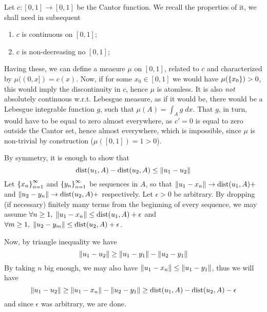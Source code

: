\documentclass[10pt]{article} %
\begin{document}
\begin{enumerate}[\bf{[}1{]}]
		Let $c:[0,1]\to[0,1]$ be the Cantor function. We recall the properties of it, we shall need in subsequent
		\begin{enumerate}[1)]
			\item $c$ is continuous on $[0,1]$;
			\item $c$ is non-decreasing no $[0,1]$;
		\end{enumerate}
		Having these, we can define a measure $\mu$ on $[0,1]$, related to $c$ and characterized by $\mu((0,x])=c(x)$.
		Now, if for some $x_0\in[0,1]$ we would have $\mu(\left\{x_0\right\})>0$, this would imply the discontinuity in $c$, hence
		$\mu$ is atomless. It is also \textit{not} absolutely continuous w.r.t. Lebesgue measure, as if it would be,
		there would be a Lebesgue integrable function $g$, such that $\mu(A)=\int_Ag\;dx$. That $g$, in turn, would have
		to be equal to zero almost everywhere, as $c'=0$ is equal to zero outside the Cantor set, hence almost everywhere,
		which is impossible, since $\mu$ is non-trivial by construction ($\mu([0,1])=1>0$).
		\setcounter{enumi}{5}
	\item By symmetry, it is enough to show that
		\[\mbox{dist}(u_1,A)-\mbox{dist}(u_2,A)\leq \|u_1-u_2\|\]
		Let $\left\{x_n\right\}_{n=1}^\infty$ and
		$\left\{y_n\right\}_{n=1}^\infty$
		be sequences in $A$, so that $\|u_1-x_n\|\to\mbox{dist}(u_1,A)+$ and $\|u_2-y_n\|\to\mbox{dist}(u_2,A)+$ 
		respectively. Let $\epsilon>0$ be arbitrary. By dropping (if necessary) finitely many terms from the beginning
		of every sequence, we may assume $\forall n\geq1,\;\|u_1-x_n\|\leq\mbox{dist}(u_1,A)+\epsilon$ and
		$\forall m\geq1,\;\|u_2-y_m\|\leq\mbox{dist}(u_2,A)+\epsilon$.

		Now, by triangle inequality we have
		\[\|u_1-u_2\|\geq\|u_1-y_1\|-\|u_2-y_1\|\]
		By taking $n$ big enough, we may also have $\|u_1-x_n\|\leq\|u_1-y_1\|$, thus we will have
		\[\|u_1-u_2\|\geq\|u_1-x_n\|-\|u_2-y_1\|\geq\mbox{dist}(u_1,A)-\mbox{dist}(u_2,A)-\epsilon\]
		and since $\epsilon$ was arbitrary, we are done.
\end{enumerate}
\end{document}
